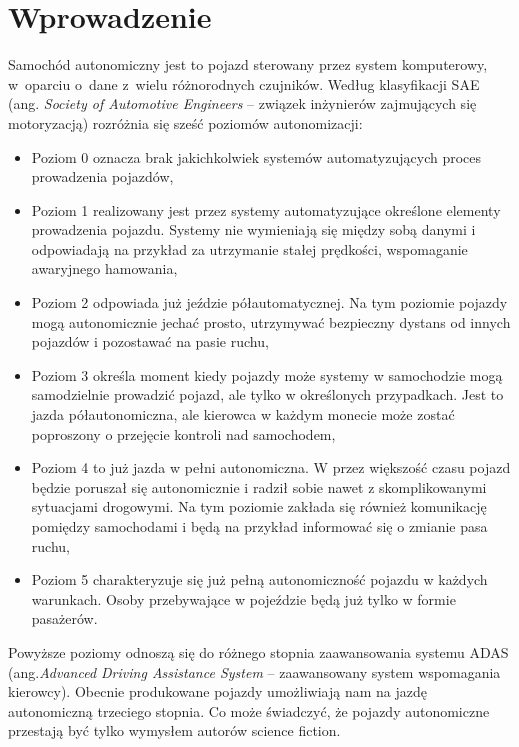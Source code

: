 \chapter{Wprowadzenie}

Samochód  autonomiczny jest to pojazd sterowany przez system komputerowy, w~oparciu o~dane z~wielu różnorodnych czujników. 
Według klasyfikacji SAE (ang. \textit{Society of Automotive Engineers} -- związek inżynierów zajmujących się motoryzacją) rozróżnia się sześć poziomów autonomizacji:
\begin{itemize}
	\item Poziom 0 oznacza brak jakichkolwiek systemów automatyzujących proces prowadzenia pojazdów,
	\item Poziom 1 realizowany jest przez systemy automatyzujące określone elementy prowadzenia pojazdu. Systemy nie wymieniają się między sobą danymi i odpowiadają na przykład za utrzymanie stałej prędkości, wspomaganie awaryjnego hamowania,
	\item Poziom 2 odpowiada już jeździe półautomatycznej. Na tym poziomie pojazdy mogą autonomicznie jechać prosto, utrzymywać bezpieczny dystans od innych pojazdów i pozostawać na pasie ruchu,
	\item Poziom 3 określa moment kiedy pojazdy może systemy w samochodzie mogą samodzielnie prowadzić pojazd, ale tylko w określonych przypadkach. Jest to jazda półautonomiczna, ale kierowca w każdym monecie może zostać poproszony o przejęcie kontroli nad samochodem,
	\item Poziom 4 to już jazda w pełni autonomiczna. W przez większość czasu pojazd będzie poruszał się autonomicznie i  radził sobie nawet z skomplikowanymi sytuacjami drogowymi. Na tym poziomie zakłada się również komunikację pomiędzy samochodami i będą na przykład informować się o zmianie pasa ruchu,
	\item Poziom 5 charakteryzuje się już pełną autonomiczność pojazdu w każdych warunkach. Osoby przebywające w pojeździe będą już tylko w formie pasażerów.
\end{itemize}
Powyższe poziomy odnoszą się do różnego stopnia zaawansowania systemu ADAS (ang.\textit{Advanced Driving Assistance System} -- zaawansowany system wspomagania kierowcy).
Obecnie produkowane pojazdy umożliwiają nam na jazdę autonomiczną trzeciego stopnia. Co może świadczyć, że pojazdy autonomiczne przestają być tylko wymysłem autorów science fiction.

